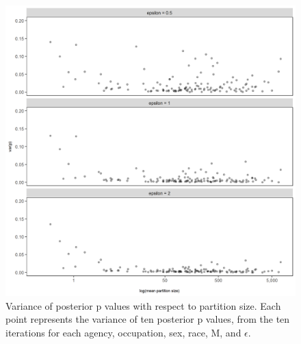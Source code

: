 \documentclass[10pt, letterpaper]{article}
\begin{document}
\begin{spacing}{1.0}
\begin{figure}[h!]
    \centering
    \includegraphics[width=6in]{RacePayDifferential-p-Variance-Partition-Size.png}
    \caption{Variance of posterior p values with respect to partition size.  Each point represents the variance of ten posterior p values, from the ten iterations for each agency, occupation, sex, race, M, and $\epsilon$.}
    \label{figure:RacePayDifferential-p-Variance-Partition-Size}
\end{figure}

\clearpage


\end{spacing}
\end{document}
